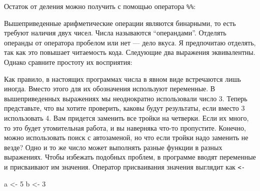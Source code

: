 \documentclass[]{book}
\newenvironment{Shaded}{\begin{snugshade}}{\end{snugshade}}
\newcommand{\DecValTok}[1]{\textcolor[rgb]{0.00,0.00,0.81}{#1}}
\newcommand{\StringTok}[1]{\textcolor[rgb]{0.31,0.60,0.02}{#1}}
\newcommand{\OperatorTok}[1]{\textcolor[rgb]{0.81,0.36,0.00}{\textbf{#1}}}
\newcommand{\NormalTok}[1]{#1}
\begin{document}
Остаток от деления можно получить с помощью оператора \texttt{\%\%}:

\begin{Shaded}
\end{Shaded}

Вышеприведенные арифметические операции являются бинарными, то есть
требуют наличия двух чисел. Числа называются ``операндами''. Отделять
операнды от оператора пробелом или нет --- дело вкуса. Я предпочитаю
отделять, так как это повышает читаемость кода. Следующие два выражения
эквивалентны. Однако сравните простоту их восприятия:

\begin{Shaded}
\end{Shaded}

\begin{Shaded}
\end{Shaded}

Как правило, в настоящих программах числа в явном виде встречаются лишь
иногда. Вместо этого для их обозначения используют переменные. В
вышеприведенных выражениях мы неоднократно использовали число 3. Теперь
представьте, что вы хотите проверить, каковы будут результаты, если
вместо 3 использовать 4. Вам придется заменить все тройки на четверки.
Если их много, то это будет утомительная работа, и вы наверняка что-то
пропустите. Конечно, можно использовать поиск с автозаменой, но что если
тройки надо заменить не везде? Одно и то же число может выполнять разные
функции в разных выражениях. Чтобы избежать подобных проблем, в
программе вводят переменные и присваивают им значения. Оператор
присваивания значения выглядит как \texttt{\textless{}-}

\begin{Shaded}
\begin{Highlighting}[]
\NormalTok{a <-}\StringTok{ }\DecValTok{5}
\NormalTok{b <-}\StringTok{ }\DecValTok{3}
\end{Highlighting}
\end{Shaded}
\end{document}
